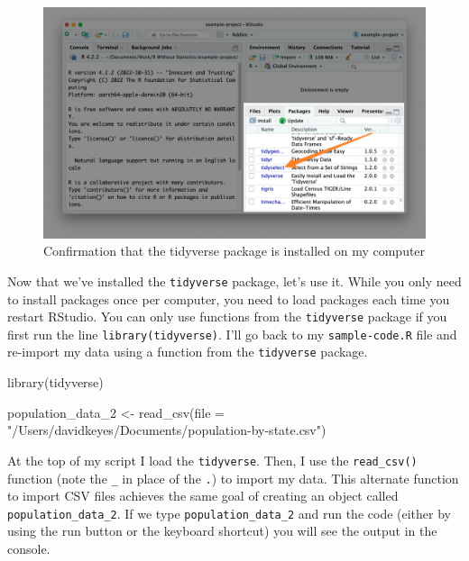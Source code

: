\documentclass[
]{book}
\newenvironment{Shaded}{\begin{snugshade}}{\end{snugshade}}
\newcommand{\AttributeTok}[1]{\textcolor[rgb]{0.77,0.63,0.00}{#1}}
\newcommand{\FunctionTok}[1]{\textcolor[rgb]{0.00,0.00,0.00}{#1}}
\newcommand{\NormalTok}[1]{#1}
\newcommand{\OtherTok}[1]{\textcolor[rgb]{0.56,0.35,0.01}{#1}}
\newcommand{\StringTok}[1]{\textcolor[rgb]{0.31,0.60,0.02}{#1}}
\begin{document}
\begin{figure}
\includegraphics[width=1\linewidth]{assets/tidyverse-installed} \caption{Confirmation that the tidyverse package is installed on my computer}\label{fig:tidyverse-installed}
\end{figure}

Now that we've installed the \texttt{tidyverse} package, let's use it. While you only need to install packages once per computer, you need to load packages each time you restart RStudio. You can only use functions from the \texttt{tidyverse} package if you first run the line \texttt{library(tidyverse)}. I'll go back to my \texttt{sample-code.R} file and re-import my data using a function from the \texttt{tidyverse} package.

\begin{Shaded}
\begin{Highlighting}[]
\FunctionTok{library}\NormalTok{(tidyverse)}

\NormalTok{population\_data\_2 }\OtherTok{\textless{}{-}} \FunctionTok{read\_csv}\NormalTok{(}\AttributeTok{file =} \StringTok{"/Users/davidkeyes/Documents/population{-}by{-}state.csv"}\NormalTok{)}
\end{Highlighting}
\end{Shaded}

At the top of my script I load the \texttt{tidyverse}. Then, I use the \texttt{read\_csv()} function (note the \texttt{\_} in place of the \texttt{.}) to import my data. This alternate function to import CSV files achieves the same goal of creating an object called \texttt{population\_data\_2}. If we type \texttt{population\_data\_2} and run the code (either by using the run button or the keyboard shortcut) you will see the output in the console.
\end{document}
